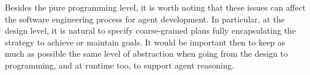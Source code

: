 %

%


\noindent Besides the pure programming level, it is worth noting that
these issues can affect the %
software engineering process for agent development.
In particular, at the design level, it is natural to specify
coarse-grained plans fully encapsulating the strategy to achieve or
maintain goals.
%
It would be important then to keep as much as possible the same level
of abstraction when going from the design to programming, and at
runtime too, to support agent reasoning.


%
%


